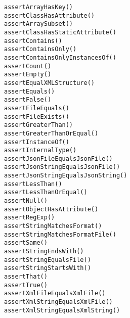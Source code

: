 \documentclass[a4paper,10pt]{scrartcl}
\begin{document}
\begin{verbatim}
assertArrayHasKey()
assertClassHasAttribute()
assertArraySubset()
assertClassHasStaticAttribute()
assertContains()
assertContainsOnly()
assertContainsOnlyInstancesOf()
assertCount()
assertEmpty()
assertEqualXMLStructure()
assertEquals()
assertFalse()
assertFileEquals()
assertFileExists()
assertGreaterThan()
assertGreaterThanOrEqual()
assertInstanceOf()
assertInternalType()
assertJsonFileEqualsJsonFile()
assertJsonStringEqualsJsonFile()
assertJsonStringEqualsJsonString()
assertLessThan()
assertLessThanOrEqual()
assertNull()
assertObjectHasAttribute()
assertRegExp()
assertStringMatchesFormat()
assertStringMatchesFormatFile()
assertSame()
assertStringEndsWith()
assertStringEqualsFile()
assertStringStartsWith()
assertThat()
assertTrue()
assertXmlFileEqualsXmlFile()
assertXmlStringEqualsXmlFile()
assertXmlStringEqualsXmlString()
\end{verbatim}
\end{document}
